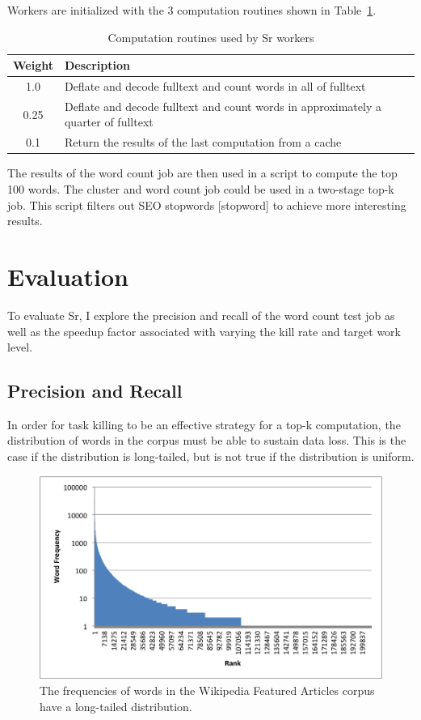 \documentclass[12pt]{article}
\begin{document}
Workers are initialized with the 3 computation routines shown in Table~\ref{table:workerTasks}.

\begin{table}
\begin{tabularx}{\linewidth}{|c|X|}
 \hline
Weight & Description \\ \hline
1.0 & Deflate and decode fulltext and count words in all of fulltext \\ \hline
0.25 & Deflate and decode fulltext and count words in approximately a quarter of fulltext \\ \hline
0.1 & Return the results of the last computation from a cache \\ \hline
\end{tabularx}
\caption{Computation routines used by Sr workers}
\label{table:workerTasks}
\end{table}

The results of the word count job are then used in a script to compute the top 100 words. The cluster and word count job could be used in a two-stage top-k job. This script filters out SEO stopwords [stopword] to achieve more interesting results.

\section{Evaluation}
\label{sec:evaluation}
To evaluate Sr, I explore the precision and recall of the word count test job as well as the speedup factor associated with varying the kill rate and target work level.

\subsection{Precision and Recall}
In order for task killing to be an effective strategy for a top-k computation, the distribution of words in the corpus must be able to sustain data loss. This is the case if the distribution is long-tailed, but is not true if the distribution is uniform.

\begin{figure}
\includegraphics[width=\linewidth]{long-tail-ranks.png}
\caption{The frequencies of words in the Wikipedia Featured Articles corpus have a long-tailed distribution.}
\label{fig:wordDist}
\end{figure}
\end{document}
